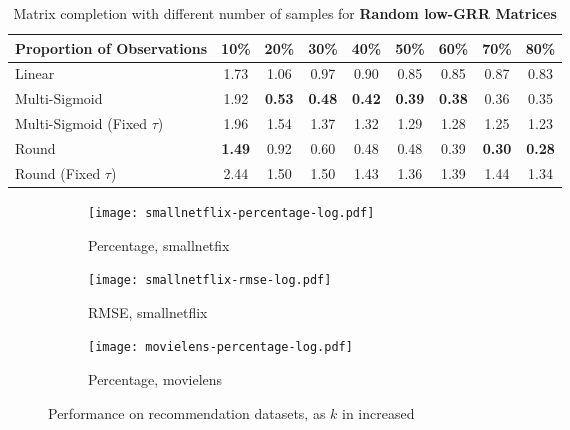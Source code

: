 \documentclass{article}
\begin{document}
\begin{table*}[tb]
	\centering
	\caption{Matrix completion with different number of samples for \textbf{Random low-GRR Matrices}}
	\label{tab:MC-Ra}
\begin{tabular}{lcccccccc}
\toprule
Proportion of Observations& 10\%& 20\%& 30\%& 40\%& 50\%& 60\%& 70\%& 80\% \\ \midrule
Linear&1.73&1.06&0.97&0.90&0.85&0.85&0.87&0.83\\ %
\addlinespace
Multi-Sigmoid&1.92&\bf{0.53}&\bf{0.48}&\bf{0.42}&\bf{0.39}&\bf{0.38}&0.36&0.35\\ %
Multi-Sigmoid (Fixed $\tau$)&1.96&1.54&1.37&1.32&1.29&1.28&1.25&1.23\\ %
Round&\bf{1.49}&0.92&0.60&0.48&0.48&0.39&\bf{0.30}&\bf{0.28}\\ %
Round (Fixed $\tau$)&2.44&1.50&1.50&1.43&1.36&1.39&1.44&1.34\\ \bottomrule
\end{tabular}
\end{table*}

\begin{figure*}[tb]
	\centering
	\begin{subfigure}{0.30\textwidth}
		\centering
		\texttt{[image: smallnetflix-percentage-log.pdf]}
		\caption{Percentage, smallnetfix}
	\end{subfigure}
	\begin{subfigure}{0.32\textwidth}
		\centering
		\texttt{[image: smallnetflix-rmse-log.pdf]}
		\caption{RMSE, smallnetflix}
	\end{subfigure}
	\begin{subfigure}{0.32\textwidth}
		\centering
		\texttt{[image: movielens-percentage-log.pdf]}
		\caption{Percentage, movielens}
	\end{subfigure}
	
	\caption{Performance on recommendation datasets, as $k$ in increased}
	\label{fig:smallnet}
\end{figure*}
\end{document}
